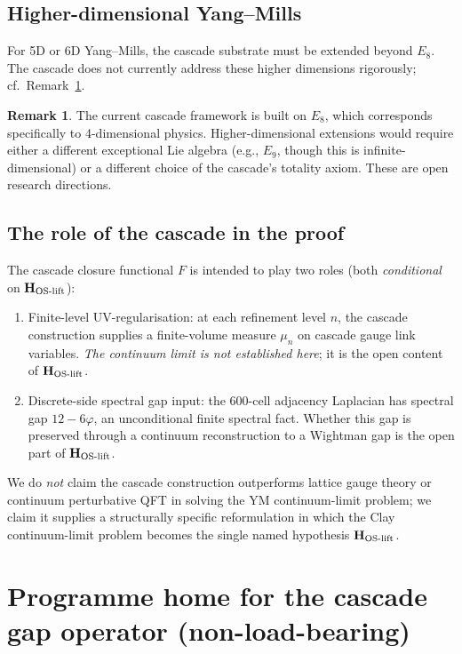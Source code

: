 \documentclass[11pt, a4paper]{amsart}
\theoremstyle{definition}
\newtheorem{remark}[theorem]{Remark}
\begin{document}
\subsection{Higher-dimensional Yang--Mills}

For 5D or 6D Yang--Mills, the cascade substrate must be extended
beyond $E_8$. The cascade does not currently address these higher
dimensions rigorously; cf.~Remark~\ref{rem:higher}.

\begin{remark}\label{rem:higher}
The current cascade framework is built on $E_8$, which corresponds
specifically to 4-dimensional physics. Higher-dimensional extensions
would require either a different exceptional Lie algebra (e.g., $E_9$,
though this is infinite-dimensional) or a different choice of the
cascade's totality axiom. These are open research directions.
\end{remark}

\subsection{The role of the cascade in the proof}

The cascade closure functional $F$ is intended to play two roles
(both \emph{conditional} on $\mathbf{H_{\rm OS\text{-}lift}}$):
\begin{enumerate}
  \item Finite-level UV-regularisation: at each refinement level $n$,
    the cascade construction supplies a finite-volume measure $\mu_n$
    on cascade gauge link variables. \emph{The continuum limit is
    not established here}; it is the open content of
    $\mathbf{H_{\rm OS\text{-}lift}}$.
  \item Discrete-side spectral gap input: the 600-cell adjacency
    Laplacian has spectral gap $12-6\varphi$, an unconditional
    finite spectral fact. Whether this gap is preserved through
    a continuum reconstruction to a Wightman gap is the open part
    of $\mathbf{H_{\rm OS\text{-}lift}}$.
\end{enumerate}

We do \emph{not} claim the cascade construction outperforms lattice
gauge theory or continuum perturbative QFT in solving the YM
continuum-limit problem; we claim it supplies a structurally
specific reformulation in which the Clay continuum-limit problem
becomes the single named hypothesis $\mathbf{H_{\rm OS\text{-}lift}}$.

\section{Programme home for the cascade gap operator (non-load-bearing)}\label{sec:aria_home}
\end{document}
